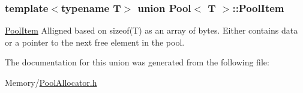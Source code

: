 \subsubsection*{template$<$typename T$>$\newline
union Pool$<$ T $>$\+::\+Pool\+Item}

\hyperlink{unionPool_1_1PoolItem}{Pool\+Item} Alligned based on sizeof(\+T) as an array of bytes. Either contains data or a pointer to the next free element in the pool. 

The documentation for this union was generated from the following file\+:\begin{DoxyCompactItemize}
\item 
Memory/\hyperlink{PoolAllocator_8h}{Pool\+Allocator.\+h}\end{DoxyCompactItemize}
